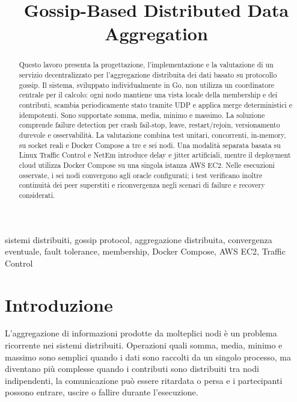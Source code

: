 \documentclass[conference]{IEEEtran}
\begin{document}
\title{Gossip-Based Distributed Data Aggregation}

\author{
}

\maketitle

\begin{abstract}
Questo lavoro presenta la progettazione, l'implementazione e la valutazione di un servizio decentralizzato per l'aggregazione distribuita dei dati basato su protocollo gossip. Il sistema, sviluppato individualmente in Go, non utilizza un coordinatore centrale per il calcolo: ogni nodo mantiene una vista locale della membership e dei contributi, scambia periodicamente stato tramite UDP e applica merge deterministici e idempotenti. Sono supportate somma, media, minimo e massimo. La soluzione comprende failure detection per crash fail-stop, leave, restart/rejoin, versionamento durevole e osservabilità. La valutazione combina test unitari, concorrenti, in-memory, su socket reali e Docker Compose a tre e sei nodi. Una modalità separata basata su Linux Traffic Control e NetEm introduce delay e jitter artificiali, mentre il deployment cloud utilizza Docker Compose su una singola istanza AWS EC2. Nelle esecuzioni osservate, i sei nodi convergono agli oracle configurati; i test verificano inoltre continuità dei peer superstiti e riconvergenza negli scenari di failure e recovery considerati.
\end{abstract}

\begin{IEEEkeywords}
sistemi distribuiti, gossip protocol, aggregazione distribuita, convergenza eventuale, fault tolerance, membership, Docker Compose, AWS EC2, Traffic Control
\end{IEEEkeywords}

\section{Introduzione}

L'aggregazione di informazioni prodotte da molteplici nodi è un problema ricorrente nei sistemi distribuiti. Operazioni quali somma, media, minimo e massimo sono semplici quando i dati sono raccolti da un singolo processo, ma diventano più complesse quando i contributi sono distribuiti tra nodi indipendenti, la comunicazione può essere ritardata o persa e i partecipanti possono entrare, uscire o fallire durante l'esecuzione.
\end{document}
